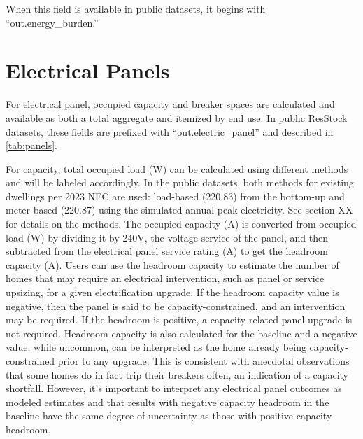 When this field is available in public datasets, it begins with ``out.energy\_burden.''
\section{Electrical Panels}
For electrical panel, occupied capacity and breaker spaces are calculated and available as both a total aggregate and itemized by end use. In public ResStock datasets, these fields are prefixed with “out.electric_panel” and described in \ref{tab:panels}. 

For capacity, total occupied load (W) can be calculated using different methods and will be labeled accordingly. In the public datasets, both methods for existing dwellings per 2023 NEC are used: load-based (220.83) from the bottom-up and meter-based (220.87) using the simulated annual peak electricity. See section XX for details on the methods. The occupied capacity (A) is converted from occupied load (W) by dividing it by 240V, the voltage service of the panel, and then subtracted from the electrical panel service rating (A) to get the headroom capacity (A). Users can use the headroom capacity to estimate the number of homes that may require an electrical intervention, such as panel or service upsizing, for a given electrification upgrade. If the headroom capacity value is negative, then the panel is said to be capacity-constrained, and an intervention may be required. If the headroom is positive, a capacity-related panel upgrade is not required. Headroom capacity is also calculated for the baseline and a negative value, while uncommon, can be interpreted as the home already being capacity-constrained prior to any upgrade. This is consistent with anecdotal observations that some homes do in fact trip their breakers often, an indication of a capacity shortfall. However, it's important to interpret any electrical panel outcomes as modeled estimates and that results with negative capacity headroom in the baseline have the same degree of uncertainty as those with positive capacity headroom.  

